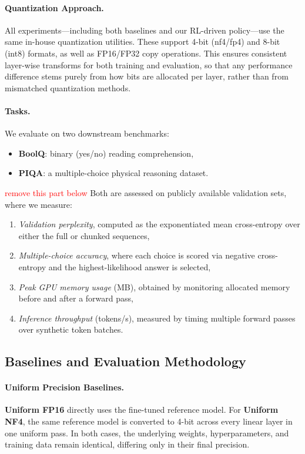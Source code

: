 \documentclass{article}
\newcommand{\red}[1]{\textcolor{red}{#1}}
\begin{document}
	\paragraph{Quantization Approach.}
	All experiments---including both baselines and our RL-driven policy---use the same in-house quantization utilities. These support 4-bit (nf4/fp4) and 8-bit (int8) formats, as well as FP16/FP32 copy operations. This ensures consistent layer-wise transforms for both training and evaluation, so that any performance difference stems purely from how bits are allocated per layer, rather than from mismatched quantization methods.
	
	\paragraph{Tasks.}
	We evaluate on two downstream benchmarks:
	\begin{itemize}
		\item \textbf{BoolQ}: binary (yes/no) reading comprehension,
		\item \textbf{PIQA}: a multiple-choice physical reasoning dataset.
	\end{itemize}
	\red{remove this part below}
	Both are assessed on publicly available validation sets, where we measure:
	\begin{enumerate}
		\item \emph{Validation perplexity}, computed as the exponentiated mean cross-entropy over either the full or chunked sequences,
		\item \emph{Multiple-choice accuracy}, where each choice is scored via negative cross-entropy and the highest-likelihood answer is selected,
		\item \emph{Peak GPU memory usage} (MB), obtained by monitoring allocated memory before and after a forward pass,
		\item \emph{Inference throughput} (tokens/s), measured by timing multiple forward passes over synthetic token batches.
	\end{enumerate}
	
	\subsection{Baselines and Evaluation Methodology}
	
	\paragraph{Uniform Precision Baselines.}
	\textbf{Uniform FP16} directly uses the fine-tuned reference model. For \textbf{Uniform NF4}, the same reference model is converted to 4-bit across every linear layer in one uniform pass. In both cases, the underlying weights, hyperparameters, and training data remain identical, differing only in their final precision.
	
\end{document}
